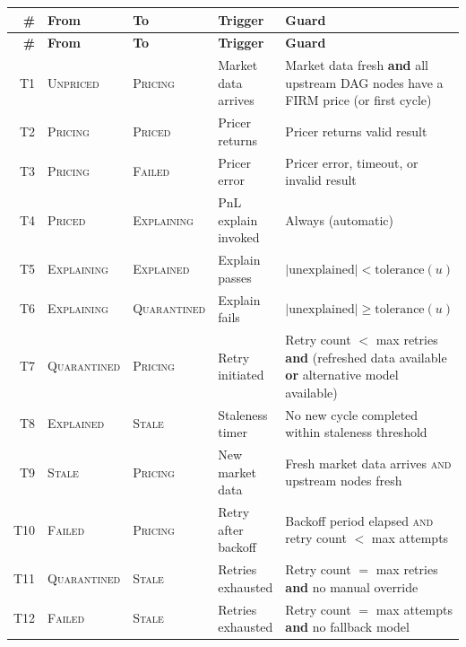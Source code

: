 \documentclass[11pt,a4paper]{article}
\begin{document}
\begin{center}
\small
\begin{longtable}{r l l l l}
\toprule
\textbf{\#} & \textbf{From} & \textbf{To} & \textbf{Trigger} & \textbf{Guard} \\
\midrule
\endfirsthead
\toprule
\textbf{\#} & \textbf{From} & \textbf{To} & \textbf{Trigger} & \textbf{Guard} \\
\midrule
\endhead
T1 & \textsc{Unpriced} & \textsc{Pricing} & Market data arrives & \parbox[t]{4.5cm}{Market data fresh \textbf{and} all upstream DAG nodes have a FIRM price (or first cycle)} \\[8pt]
T2 & \textsc{Pricing} & \textsc{Priced} & Pricer returns & Pricer returns valid result \\[4pt]
T3 & \textsc{Pricing} & \textsc{Failed} & Pricer error & Pricer error, timeout, or invalid result \\[4pt]
T4 & \textsc{Priced} & \textsc{Explaining} & PnL explain invoked & Always (automatic) \\[4pt]
T5 & \textsc{Explaining} & \textsc{Explained} & Explain passes & $|\text{unexplained}| < \text{tolerance}(u)$ \\[4pt]
T6 & \textsc{Explaining} & \textsc{Quarantined} & Explain fails & $|\text{unexplained}| \geq \text{tolerance}(u)$ \\[4pt]
T7 & \textsc{Quarantined} & \textsc{Pricing} & Retry initiated & \parbox[t]{4.5cm}{Retry count $<$ max retries \textbf{and} (refreshed data available \textbf{or} alternative model available)} \\[8pt]
T8 & \textsc{Explained} & \textsc{Stale} & Staleness timer & \parbox[t]{4.5cm}{No new cycle completed within staleness threshold} \\[8pt]
T9 & \textsc{Stale} & \textsc{Pricing} & New market data & \parbox[t]{4.5cm}{Fresh market data arrives \textsc{and} upstream nodes fresh} \\[8pt]
T10 & \textsc{Failed} & \textsc{Pricing} & Retry after backoff & \parbox[t]{4.5cm}{Backoff period elapsed \textsc{and} retry count $<$ max attempts} \\[8pt]
T11 & \textsc{Quarantined} & \textsc{Stale} & Retries exhausted & \parbox[t]{4.5cm}{Retry count $=$ max retries \textbf{and} no manual override} \\[4pt]
T12 & \textsc{Failed} & \textsc{Stale} & Retries exhausted & \parbox[t]{4.5cm}{Retry count $=$ max attempts \textbf{and} no fallback model} \\[4pt]
\bottomrule
\end{longtable}
\end{center}
\end{document}
